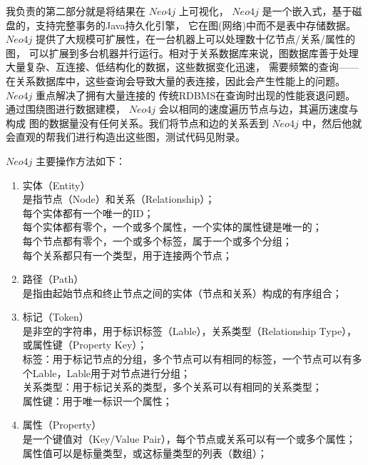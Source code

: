 \documentclass[UTF8]{ctexart}
\begin{document}
\par{
我负责的第二部分就是将结果在 $Neo4j$ 上可视化， $Neo4j$ 是一个嵌入式，基于磁盘的，支持完整事务的Java持久化引擎，
它在图(网络)中而不是表中存储数据。 $Neo4j$ 提供了大规模可扩展性，在一台机器上可以处理数十亿节点/关系/属性的图，
可以扩展到多台机器并行运行。相对于关系数据库来说，图数据库善于处理大量复杂、互连接、低结构化的数据，这些数据变化迅速，
需要频繁的查询——在关系数据库中，这些查询会导致大量的表连接，因此会产生性能上的问题。 $Neo4j$ 重点解决了拥有大量连接的
传统RDBMS在查询时出现的性能衰退问题。通过围绕图进行数据建模， $Neo4j$ 会以相同的速度遍历节点与边，其遍历速度与构成
图的数据量没有任何关系。我们将节点和边的关系丢到 $Neo4j$ 中，然后他就会直观的帮我们进行构造出这些图，测试代码见附录。
}
\par{
	$ Neo4j$ 主要操作方法如下：
	\begin{enumerate}[(1)]
		\item 实体（Entity）\\
		是指节点（Node）和关系（Relationship）；\\
		每个实体都有一个唯一的ID；\\
		每个实体都有零个，一个或多个属性，一个实体的属性键是唯一的；\\
		每个节点都有零个，一个或多个标签，属于一个或多个分组；\\
		每个关系都只有一个类型，用于连接两个节点；\\
		
		
		\item 	路径（Path）\\
		是指由起始节点和终止节点之间的实体（节点和关系）构成的有序组合；\\
		\item 标记（Token）\\
		是非空的字符串，用于标识标签（Lable），关系类型（Relationship Type），或属性键（Property Key）；\\
		标签：用于标记节点的分组，多个节点可以有相同的标签，一个节点可以有多个Lable，Lable用于对节点进行分组；\\
		关系类型：用于标记关系的类型，多个关系可以有相同的关系类型；\\
		属性键：用于唯一标识一个属性；\\
		\item 属性（Property）\\
		是一个键值对（Key/Value Pair），每个节点或关系可以有一个或多个属性；属性值可以是标量类型，或这标量类型的列表（数组）；
		
	\end{enumerate}
	
}
\end{document}
